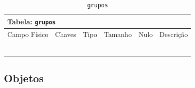 \documentclass[12pt,a4paper]{article}
\begin{document}
\begin{center}
\begin{table}[h!]
	\caption{\texttt{grupos}}
	\label{tabela:grupos}
	\begin{tabular}{|p{2.5cm}|p{1cm}|p{1.25cm}|p{1.75cm}|p{1.25cm}|p{5cm}|}\hline	
		\multicolumn{6}{|p{16cm}|}{\cellcolor{cinzaClaro}  \centering Tabela: \texttt{grupos}} \\ \hline %
		{\small Campo Físico}   & {\small Chaves} & {\small Tipo} & {\small Tamanho} & {\small Nulo} & {\small Descrição}\\\hline %
		
		{\tiny } & {\tiny } & {\tiny } & {\tiny } & {\tiny } &{\tiny }\\\hline
		{\tiny } & {\tiny } & {\tiny } & {\tiny } & {\tiny } &{\tiny }\\\hline
		{\tiny } & {\tiny } & {\tiny } & {\tiny } & {\tiny } &{\tiny }\\\hline
		{\tiny } & {\tiny } & {\tiny } & {\tiny } & {\tiny } &{\tiny }\\\hline
		{\tiny } & {\tiny } & {\tiny } & {\tiny } & {\tiny } &{\tiny }\\\hline
		{\tiny } & {\tiny } & {\tiny } & {\tiny } & {\tiny } &{\tiny }\\\hline
			
	\end{tabular}
\end{table}	
\end{center}



\subsection{Objetos}

\end{document}
